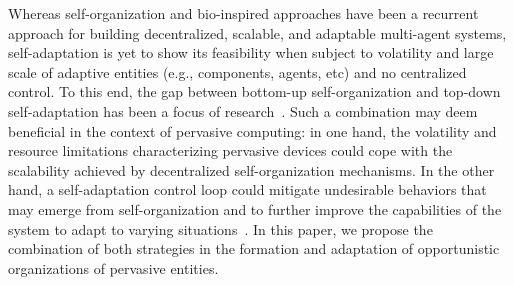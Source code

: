 Whereas self-organization and bio-inspired approaches have been a recurrent approach for building decentralized, scalable, and adaptable multi-agent systems, self-adaptation is yet to show its feasibility when subject to volatility and large scale of adaptive entities (e.g., components, agents, etc) and no centralized control. To this end, the gap between bottom-up self-organization and top-down self-adaptation has been a focus of research~\cite{Kramer:, Zambonelli:, Weyns:}. Such a combination may deem beneficial in the context of pervasive computing: in one hand, the volatility and resource limitations characterizing pervasive devices could cope with the scalability achieved by decentralized self-organization mechanisms. In the other hand, a self-adaptation control loop could mitigate undesirable behaviors that may emerge from self-organization and to further improve the capabilities of the system to adapt to varying situations~\cite{Zambonelli:}. In this paper, we propose the combination of both strategies in the formation and adaptation of opportunistic organizations of pervasive entities.


